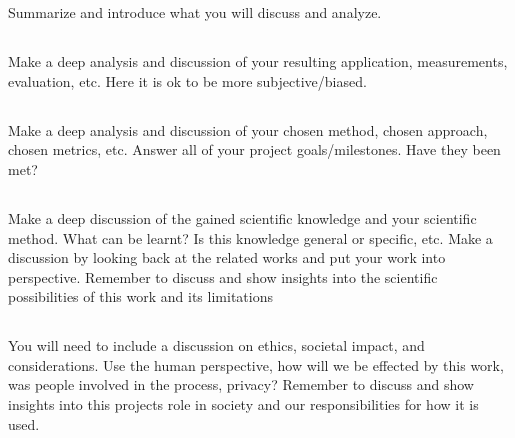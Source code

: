 \section{}\label{sec:discussion}
Summarize and introduce what you will discuss and analyze.

\subsection{}\label{subsec:discussion_analysis}
Make a deep analysis and discussion of your resulting application, measurements,
evaluation, etc. Here it is ok to be more subjective/biased.

\subsection{}\label{subsec:project_method_discussion}
Make a deep analysis and discussion of your chosen method, chosen approach,
chosen metrics, etc. Answer all of your project goals/milestones. Have they
been met?

\subsection{}\label{subsec:scientific_discussion}
Make a deep discussion of the gained scientific knowledge and your scientific
method. What can be learnt? Is this knowledge general or specific, etc. Make a
discussion by looking back at the related works and put your work into
perspective. Remember to discuss and show insights into the scientific
possibilities of this work and its limitations

\subsection{}\label{subsec:ethical_discussions}
You will need to include a discussion on ethics, societal impact, and
considerations. Use the human perspective, how will we be effected by this work,
was people involved in the process, privacy? Remember to discuss and show
insights into this projects role in society and our responsibilities for how it
is used.
